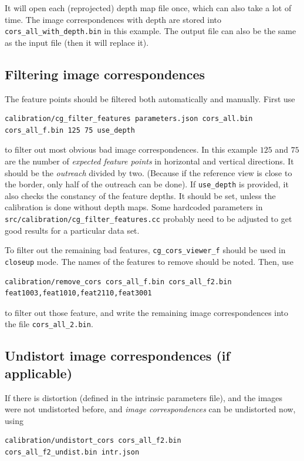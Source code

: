 \documentclass{scrreprt}
\begin{document}
\noindent It will open each (reprojected) depth map file once, which can also take a lot of time. The image correspondences with depth are stored into \texttt{cors\_all\_with\_depth.bin} in this example. The output file can also be the same as the input file (then it will replace it).


\subsection{Filtering image correspondences}
The feature points should be filtered both automatically and manually.
First use
\begin{lstlisting}[language=bash]
calibration/cg_filter_features parameters.json cors_all.bin
cors_all_f.bin 125 75 use_depth
\end{lstlisting}
to filter out most obvious bad image correspondences. In this example $125$ and $75$ are the number of \emph{expected feature points} in horizontal and vertical directions. It should be the \emph{outreach} divided by two. (Because if the reference view is close to the border, only half of the outreach can be done). If \texttt{use\_depth} is provided, it also checks the constancy of the feature depths. It should be set, unless the calibration is done without depth maps. Some hardcoded parameters in \texttt{src/calibration/cg\_filter\_features.cc} probably need to be adjusted to get good results for a particular data set.

To filter out the remaining bad features, \texttt{cg\_cors\_viewer\_f} should be used in \texttt{closeup} mode. The names of the features to remove should be noted. Then, use
\begin{lstlisting}[language=bash]
calibration/remove_cors cors_all_f.bin cors_all_f2.bin 
feat1003,feat1010,feat2110,feat3001
\end{lstlisting}
to filter out those feature, and write the remaining image correspondences into the file \texttt{cors\_all\_2.bin}.


\subsection{Undistort image correspondences (if applicable)}
If there is distortion (defined in the intrinsic parameters file), and the images were not undistorted before, and \emph{image correspondences} can be undistorted now, using
\begin{lstlisting}[language=bash]
calibration/undistort_cors cors_all_f2.bin
cors_all_f2_undist.bin intr.json
\end{lstlisting}
\end{document}
